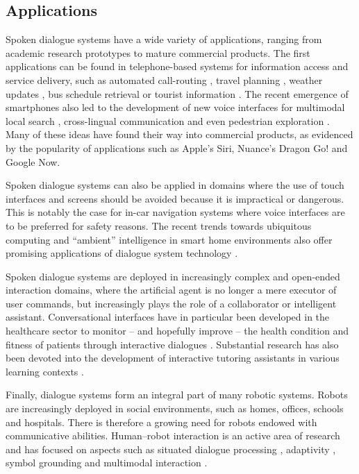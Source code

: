 \subsection{Applications}

Spoken dialogue systems have a wide variety of applications, ranging from academic research prototypes to mature commercial products. The first applications can be found in telephone-based systems for information access and service delivery, such as automated call-routing \citep{GorinRW97}, travel planning \citep{walker2001}, weather updates \citep{jupiter}, bus schedule retrieval \citep{RauxLBBE05} or tourist information \citep{lemon2006}.  The recent emergence of smartphones also led to the development of new voice interfaces for multimodal local search \citep{EhlenJ13}, cross-lingual communication \citep{yochina} and even pedestrian exploration  \citep{janarthanam2012integrating}.  Many of these ideas have found their way into commercial products, as evidenced by the popularity of applications such as Apple's Siri, Nuance's Dragon Go! and Google Now. 

Spoken dialogue systems can also be applied in domains where the use of touch interfaces and screens should be avoided because it is impractical or dangerous.  This is notably the case for in-car navigation systems \citep{cumove,CastronovoMPM10} where voice interfaces are to be preferred for safety reasons.  The recent trends towards ubiquitous computing and ``ambient'' intelligence in smart home environments also offer promising applications of dialogue system technology \citep{vipperla2009a,ambient2010}.

Spoken dialogue systems are deployed in increasingly complex and open-ended interaction domains, where the artificial agent is no longer a mere executor of user commands, but increasingly plays the role of a collaborator or intelligent assistant.  Conversational interfaces have in particular been developed in the healthcare sector to monitor -- and hopefully improve -- the health condition and fitness of patients through interactive dialogues \citep{BickmoreG06,Stahl:2009,MorbiniFDSTR12}.  Substantial research has also been devoted into the development of interactive tutoring assistants in various learning contexts \citep{ChiVLJ11,Dzikovska:2011,jan2011,TraumAAFGKLNS12}. 

Finally, dialogue systems form an integral part of many robotic systems.  Robots are increasingly deployed in social environments, such as homes, offices, schools and hospitals.  There is therefore a growing need for robots endowed with communicative abilities. Human--robot interaction is an active area of research and has focused on aspects such as situated dialogue processing \citep{CantrellSSW10,cosybook:dialogue,Kruijff2012a}, adaptivity \citep{DoshiR08}, symbol grounding \citep{Roy05,lemaignan2012} and multimodal interaction \citep{stiefelhagen2004,salem2012,MirnigWSMGBGT13}.
 
